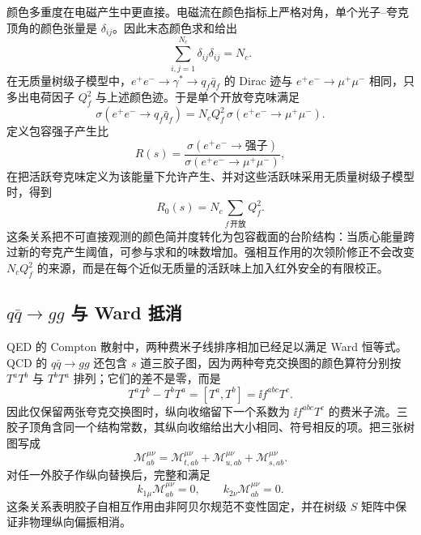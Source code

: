 颜色多重度在电磁产生中更直接。电磁流在颜色指标上严格对角，单个光子--夸克顶角的颜色张量是 $\delta_{ij}$。因此末态颜色求和给出
\begin{equation*}
 \sum_{i,j=1}^{N_c}\delta_{ij}\delta_{ij}=N_c.
\end{equation*}
在无质量树级子模型中，$e^+e^-\to\gamma^*\to q_f\bar q_f$ 的 Dirac 迹与 $e^+e^-\to\mu^+\mu^-$ 相同，只多出电荷因子 $Q_f^2$ 与上述颜色迹。于是单个开放夸克味满足
\begin{equation}
{
 \sigma(e^+e^-\to q_f\bar q_f)
 =N_cQ_f^2\,\sigma(e^+e^-\to\mu^+\mu^-).}
\label{eq:R-ratio-single-flavor-dp68}
\end{equation}
定义包容强子产生比
\begin{equation*}
 R(s)
 =\frac{\sigma(e^+e^-\to\text{强子})}
 {\sigma(e^+e^-\to\mu^+\mu^-)},
\end{equation*}
在把活跃夸克味定义为该能量下允许产生、并对这些活跃味采用无质量树级子模型时，得到
\begin{equation}
 {
 R_0(s)=N_c\sum_{f\,\text{开放}}Q_f^2.}
 \label{eq:R-ratio-tree-dp10}
\end{equation}
这条关系把不可直接观测的颜色简并度转化为包容截面的台阶结构：当质心能量跨过新的夸克产生阈值，可参与求和的味数增加。强相互作用的次领阶修正不会改变 $N_cQ_f^2$ 的来源，而是在每个近似无质量的活跃味上加入红外安全的有限校正。

\subsection{$q\bar q\to gg$ 与 Ward 抵消}

QED 的 Compton 散射中，两种费米子线排序相加已经足以满足 Ward 恒等式。QCD 的 $q\bar q\to gg$ 还包含 $s$ 道三胶子图，因为两种夸克交换图的颜色算符分别按 $T^aT^b$ 与 $T^bT^a$ 排列；它们的差不是零，而是
\begin{equation*}
 T^aT^b-T^bT^a
 =[T^a,T^b]
 =\ii f^{abc}T^c.
\end{equation*}
因此仅保留两张夸克交换图时，纵向收缩留下一个系数为 $\ii f^{abc}T^c$ 的费米子流。三胶子顶角含同一个结构常数，其纵向收缩给出大小相同、符号相反的项。把三张树图写成
\begin{equation}
{
 \mathcal M_{ab}^{\mu\nu}
 =\mathcal M_{t,ab}^{\mu\nu}
 +\mathcal M_{u,ab}^{\mu\nu}
 +\mathcal M_{s,ab}^{\mu\nu}.}
\label{eq:qcd-qqbar-gg-amplitude-sum-dp68}
\end{equation}
对任一外胶子作纵向替换后，完整和满足
\begin{equation}
 {
 k_{1\mu}\mathcal M^{\mu\nu}_{ab}=0,
 \qquad
 k_{2\nu}\mathcal M^{\mu\nu}_{ab}=0.}
 \label{eq:qcd-qqbar-gg-ward-dp32}
\end{equation}
这条关系表明胶子自相互作用由非阿贝尔规范不变性固定，并在树级 $S$ 矩阵中保证非物理纵向偏振相消。

